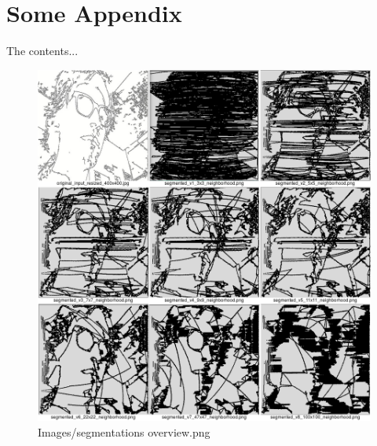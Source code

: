 
\appendix

\section{Some Appendix}
\label{whatever}
The contents...
\begin{figure}[H]
\includegraphics[width=\textwidth]{Images/segmentations_overview.png}
\caption{Images/segmentations overview.png}
\label{fig:Images/segmentations overview.png}
\end{figure}
